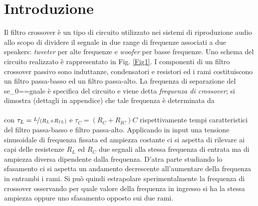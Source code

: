 \documentclass[12pt]{article}
\begin{document}
\section{Introduzione}
Il filtro crossover è un tipo di circuito utilizzato nei sistemi di riproduzione audio
allo scopo di dividere il segnale in due range di frequenze associati a due speakers: 
\textit{tweeter} per alte frequenze e \textit{woofer} per basse frequenze. Uno schema 
del circuito realizzato è rappresentato in Fig. \ref{Fig1}. I componenti 
di un filtro crossover passivo sono induttanze, condensatori e resistori 
ed i rami costituiscono un filtro passa-basso ed un filtro passa-alto. La frequenza di separazione del 
se\nu_0==gnale è specifica del circuito e viene detta \textit{frequenza di crossover}; si dimostra 
(dettagli in appendice) che tale frequenza è determinata da
\begin{equation}
  
\end{equation} 
\
\\
con $\tau_L = \nicefrac{L}{(R_L + R_{IL})}$ e $\tau_C = (R_C+R_{IC}) C$ rispettivamente tempi caratteristici del filtro passa-basso
e filtro passa-alto.
Applicando in input una tensione sinusoidale di frequenza fissata ed ampiezza costante ci si aspetta di rilevare ai capi delle resistenze
$R_L$ ed $R_C$ due segnali alla stessa frequenza di entrata ma di ampiezza diversa dipendente dalla frequenza. D'atra parte studiando lo sfasamento
ci si aspetta un andamento decrescente all'aumentare della frequenza in entrambi i rami. Si può quindi estrapolare sperimentalmente la frequenza di crossover osservando per quale valore della frequenza in ingresso si ha 
la stessa ampiezza oppure uno sfasamento opposto sui due rami. %

\end{document}
